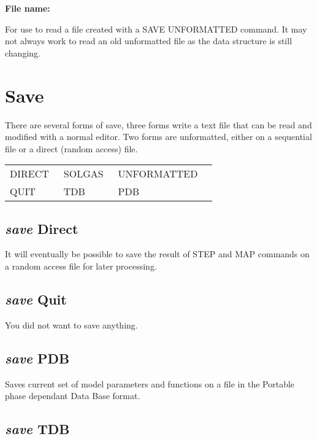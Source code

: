 \documentclass[11pt]{article}
\begin{document}
{\bf File name:}

For use to read a file created with a SAVE UNFORMATTED command.  It
may not always work to read an old unformatted file as the data
structure is still changing.

\hypertarget{Save}{}
\section{Save }

There are several forms of save, three forms write a text file that
can be read and modified with a normal editor.  Two forms are
unformatted, either on a sequential file or a direct (random access)
file.

\begin{tabular}{llll}
  DIRECT~          & SOLGAS~ & UNFORMATTED\\
  QUIT            & TDB    & PDB \\
\end{tabular}

\hypertarget{Save direct}{}
\subsection{{\em save} Direct}

It will eventually be possible to save the result of STEP and MAP
commands on a random access file for later processing.

\hypertarget{Save quit}{}
\subsection{{\em save} Quit}

You did not want to save anything.

\hypertarget{Save PDB}{}
\subsection{{\em save} PDB}

Saves current set of model parameters and functions on a file in the
Portable phase dependant Data Base format. 

\hypertarget{Save TDB}{}
\subsection{{\em save} TDB}
\end{document}
